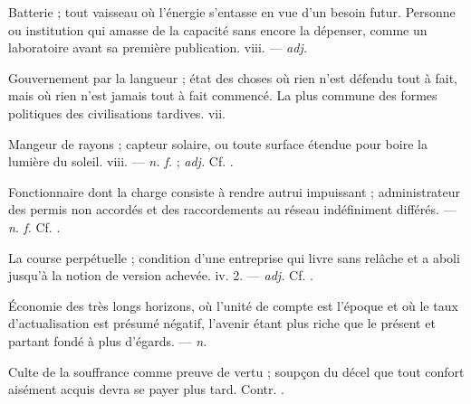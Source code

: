   Batterie ; tout vaisseau où l'énergie s'entasse en vue d'un besoin futur.   Personne ou institution qui amasse de la capacité sans encore la dépenser, comme un laboratoire avant sa première publication.   viii. ---  \textit{adj.}

 Gouvernement par la langueur ; état des choses où rien n'est défendu tout à fait, mais où rien n'est jamais tout à fait commencé. La plus commune des formes politiques des civilisations tardives.   vii.

 Mangeur de rayons ; capteur solaire, ou toute surface étendue pour boire la lumière du soleil.   viii. ---  \textit{n. f.} ;  \textit{adj.} Cf. .

 Fonctionnaire dont la charge consiste à rendre autrui impuissant ; administrateur des permis non accordés et des raccordements au réseau indéfiniment différés. ---  \textit{n. f.} Cf. .

 La course perpétuelle ; condition d'une entreprise qui livre sans relâche et a aboli jusqu'à la notion de version achevée.   iv. 2. ---  \textit{adj.} Cf. .

 Économie des très longs horizons, où l'unité de compte est l'époque et où le taux d'actualisation est présumé négatif, l'avenir étant plus riche que le présent et partant fondé à plus d'égards. ---  \textit{n.}

  Culte de la souffrance comme preuve de vertu ; soupçon du décel que tout confort aisément acquis devra se payer plus tard. Contr. .

